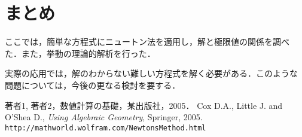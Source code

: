 \documentclass[12pt]{jarticle}
\renewcommand  \[  {\begin{eqnarray}}
\renewcommand  \]  {\end{eqnarray}}
\begin{document}
\section{まとめ}

ここでは，簡単な方程式にニュートン法を適用し，解と極限値の関係を調べ
た．また，挙動の理論的解析を行った．

実際の応用では，解のわからない難しい方程式を解く必要がある．このような
問題については，今後の更なる検討を要する．



  著者1, 著者2，数値計算の基礎，某出版社，2005．
  Cox D.A., Little J. and O'Shea D., {\em Using Algebraic Geometry}, Springer, 2005.
  \verb|http://mathworld.wolfram.com/NewtonsMethod.html|
\end{document}
